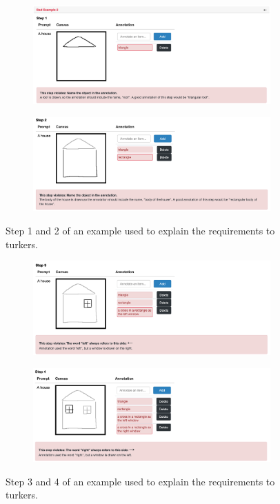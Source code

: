 \begin{figure}[!h]
\begin{subfigure}{\textwidth}
\centering
\includegraphics[width=.8\linewidth]{data_collection/v1_badeg_1.png}  
\end{subfigure}
\newline
\begin{subfigure}{\textwidth}
\centering
\includegraphics[width=.8\linewidth]{data_collection/v1_badeg_2.png}  
\end{subfigure}
\caption{Step 1 and 2 of an example used to explain the requirements to turkers.}
\label{v1.badeg.first}
\end{figure}

\begin{figure}[!h]
\begin{subfigure}{\textwidth}
\centering
\includegraphics[width=.8\linewidth]{data_collection/v1_badeg_3.png}  
\end{subfigure}
\newline
\begin{subfigure}{\textwidth}
\centering
\includegraphics[width=.8\linewidth]{data_collection/v1_badeg_4.png}  
\end{subfigure}
\caption{Step 3 and 4 of an example used to explain the requirements to turkers.}
\label{v1.badeg}
\end{figure}

